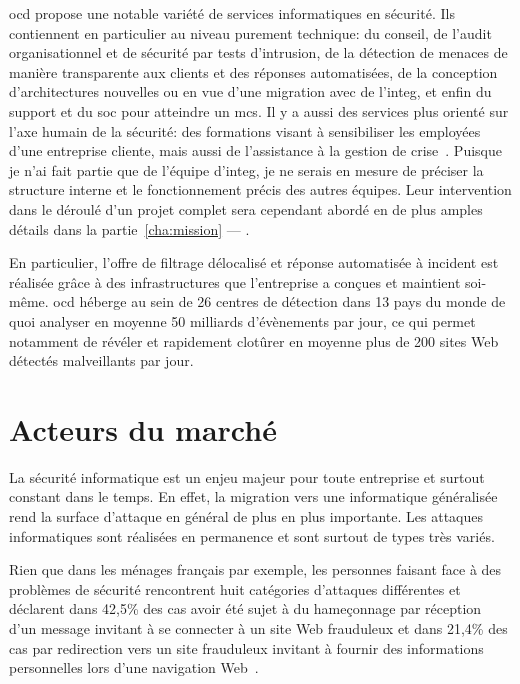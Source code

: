 \documentclass[12pt, oneside, a4paper, titlepage]{report}
\begin{document}
\acrlong{ocd} propose une notable variété de services informatiques en sécurité.
Ils contiennent en particulier au niveau purement technique: du conseil, de
l'audit organisationnel et de sécurité par tests d'intrusion, de la détection de
menaces de manière transparente aux clients et des réponses automatisées, de la
conception d'architectures nouvelles ou en vue d'une migration avec de
l'\gls{integ}, et enfin du support et du \gls{soc} pour atteindre un \gls{mcs}.
Il y a aussi des services plus orienté sur l'axe humain de la sécurité: des
formations visant à sensibiliser les employées d'une entreprise cliente, mais
aussi de l'assistance à la gestion de crise~\cite{ocd}.  Puisque je n'ai fait
partie que de l'équipe d'\gls{integ}, je ne serais en mesure de préciser la
structure interne et le fonctionnement précis des autres équipes. Leur
intervention dans le déroulé d'un projet complet sera cependant abordé en de
plus amples détails dans la partie~\ref{cha:mission} --- .

En particulier, l'offre de filtrage délocalisé et réponse automatisée à incident
est réalisée grâce à des infrastructures que l'entreprise a conçues et maintient
soi-même. \acrlong{ocd} héberge au sein de 26 centres de détection dans 13 pays
du monde de quoi analyser en moyenne 50 milliards d'évènements par jour, ce qui
permet notamment de révéler et rapidement clotûrer en moyenne plus de 200 sites
Web détectés malveillants par jour.


\section{Acteurs du marché}%
\label{sec:intro::acteurs}

La sécurité informatique est un enjeu majeur pour toute entreprise et surtout
constant dans le temps. En effet, la migration vers une informatique généralisée
rend la surface d'attaque en général de plus en plus importante. Les attaques
informatiques sont réalisées en permanence et sont surtout de types très variés.

Rien que dans les ménages français par exemple, les personnes faisant face à des
problèmes de sécurité rencontrent huit catégories d'attaques différentes et
déclarent dans 42,5\% des cas avoir été sujet à du hameçonnage par réception
d'un message invitant à se connecter à un site Web frauduleux et dans 21,4\% des
cas par redirection vers un site frauduleux invitant à fournir des informations
personnelles lors d'une navigation Web~\cite{attack-types}.
\end{document}
